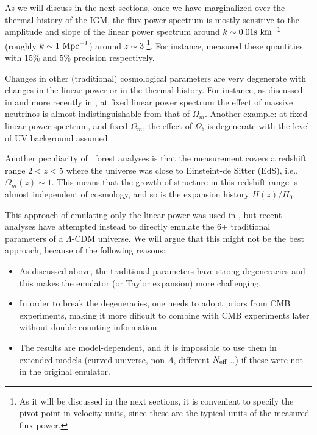 As we will discuss in the next sections, once we have marginalized over
the thermal history of the IGM, the flux power spectrum is mostly
sensitive to the amplitude and slope of the linear power spectrum around
$k \sim 0.01 {\rm s~km^{-1}}$ (roughly $k \sim 1 \ \text{Mpc}^{-1}$) around $z \sim 3$
\footnote{As it will be discussed in the next sections, it is convenient
to specify the pivot point in velocity units, since these are the typical
units of the measured flux power.}.
For instance, \cite{McDonald2005a} measured these quantities with 15\% and
5\% precision respectively.

Changes in other (traditional) cosmological parameters are very degenerate
with changes in the linear power or in the thermal history.
For instance, as discussed in \cite{Viel2010} and more recently in
\cite{Pedersen2018}, at fixed linear power spectrum the effect of massive
neutrinos is almost indistinguishable from that of $\Omega_m$.
Another example: at fixed linear power spectrum, and fixed $\Omega_m$, the
effect of $\Omega_b$ is degenerate with the level of UV background assumed.

Another peculiarity of \lya\ forest analyses is that the measurement
covers a redshift range $2 < z < 5$ where the universe was close
to Einsteint-de Sitter (EdS), i.e., $\Omega_m(z) \sim 1$.
This means that the growth of structure in this redshift range is almost
independent of cosmology, and so is the expansion history $H(z)/H_0$.

This approach of emulating only the linear power was used in
\cite{McDonald2005a}, but recent analyses
\cite{Palanque-Delabrouille2015,Yeche2017} have attempted instead to
directly emulate the 6+ traditional parameters of a $\Lambda$-CDM universe.
We will argue that this might not be the best approach, because of the
following reasons:
\begin{itemize}
 \item As discussed above, the traditional parameters have strong degeneracies
  and this makes the emulator (or Taylor expansion) more challenging.
 \item In order to break the degeneracies, one needs to adopt priors from
  CMB experiments, making it more dificult to combine with CMB experiments
  later without double counting information.
 \item The results are model-dependent, and it is impossible to use them in
  extended models (curved universe, non-$\Lambda$, different $N_{\rm eff}$...)
  if these were not in the original emulator.
\end{itemize}


